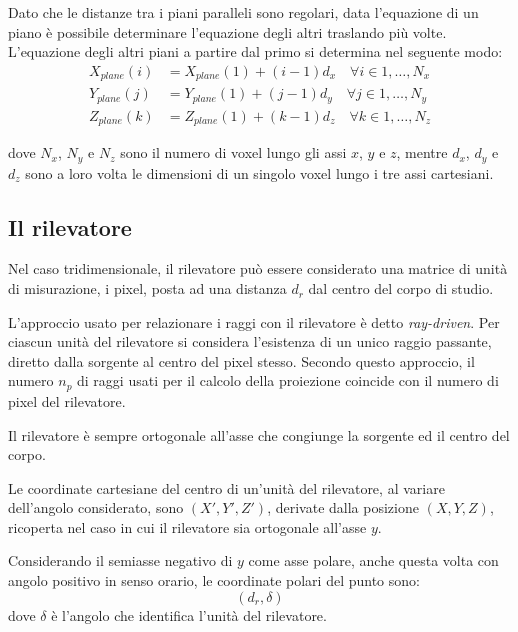 \documentclass[12pt,a4paper]{report}
\begin{document}
Dato che le distanze tra i piani paralleli sono regolari, data l'equazione di un piano è possibile determinare l'equazione degli
altri traslando più volte.
L'equazione degli altri piani a partire dal primo si determina nel seguente modo:
\begin{align*}
  X_{plane}(i) &= X_{plane}(1) + (i - 1) d_x \quad \forall i \in 1, \dots, N_x \\
  Y_{plane}(j) &= Y_{plane}(1) + (j - 1) d_y \quad \forall j \in 1, \dots, N_y \\
  Z_{plane}(k) &= Z_{plane}(1) + (k - 1) d_z \quad \forall k \in 1, \dots, N_z
\end{align*}

dove \(N_x\), \(N_y\) e \(N_z\) sono il numero di voxel lungo gli assi \(x\), \(y\) e \(z\), mentre \(d_x\), \(d_y\) e \(d_z\)
sono a loro volta le dimensioni di un singolo voxel lungo i tre assi cartesiani.

\subsection{Il rilevatore}

Nel caso tridimensionale, il rilevatore può essere considerato una matrice di unità di misurazione, i pixel, posta ad una distanza
\(d_r\) dal centro del corpo di studio.

L'approccio usato per relazionare i raggi con il rilevatore è detto \textit{ray-driven}.
Per ciascun unità del rilevatore si considera l'esistenza di un unico raggio passante, diretto dalla sorgente al centro del
pixel stesso.
Secondo questo approccio, il numero \(n_p\) di raggi usati per il calcolo della proiezione coincide con il numero di pixel del
rilevatore.

Il rilevatore è sempre ortogonale all'asse che congiunge la sorgente ed il centro del corpo.

Le coordinate cartesiane del centro di un'unità del rilevatore, al variare dell'angolo considerato, sono \((X', Y', Z')\),
derivate dalla posizione \((X, Y, Z)\), ricoperta nel caso in cui il rilevatore sia ortogonale all'asse \(y\).

Considerando il semiasse negativo di \(y\) come asse polare, anche questa volta con angolo positivo in senso orario, le
coordinate polari del punto sono:
\begin{equation*} %
  (d_r, \delta)
\end{equation*}
dove \(\delta\) è l'angolo che identifica l'unità del rilevatore.
\end{document}
